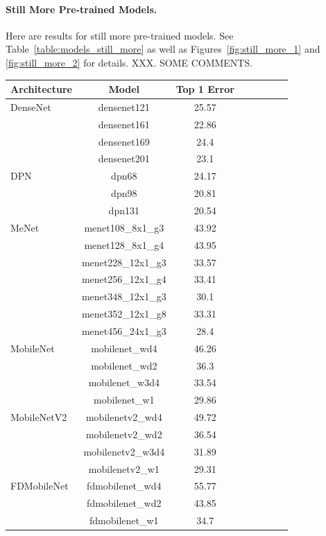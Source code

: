{\paragraph{Still More Pre-trained Models.}

Here are results for still more pre-trained models.
See
Table~\ref{table:models_still_more}
as well as
Figures~\ref{fig:still_more_1} and \ref{fig:still_more_2}
for details.
XXX.  SOME COMMENTS.


\begin{table}[!htb]
\small
\begin{center}
\begin{tabular}{|p{1in}|c|c|c|c|c|c|c|}
\hline
Architecture 
 & Model
 & Top 1 Error \\
 \hline
 DenseNet & densenet121 & 25.57 & \\
& densenet161 & 22.86 & \\
& densenet169 & 24.4 & \\
& densenet201 & 23.1 & \\\hline
DPN & dpn68 & 24.17 & \\
& dpn98 & 20.81 & \\
& dpn131 & 20.54 & \\
\hline
MeNet & menet108\_8x1\_g3 & 43.92 & \\
& menet128\_8x1\_g4 & 43.95 & \\
& menet228\_12x1\_g3 & 33.57 & \\
& menet256\_12x1\_g4 & 33.41 & \\
& menet348\_12x1\_g3 & 30.1 & \\
& menet352\_12x1\_g8 & 33.31 & \\
& menet456\_24x1\_g3 & 28.4 & \\
\hline
MobileNet & mobilenet\_wd4 & 46.26 & \\
& mobilenet\_wd2 & 36.3 & \\
& mobilenet\_w3d4 & 33.54 & \\
& mobilenet\_w1 & 29.86 & \\
\hline
MobileNetV2 & mobilenetv2\_wd4 & 49.72 & \\
& mobilenetv2\_wd2 & 36.54 & \\
& mobilenetv2\_w3d4 & 31.89 & \\
& mobilenetv2\_w1 & 29.31 & \\
\hline
FDMobileNet & fdmobilenet\_wd4 & 55.77 & \\
& fdmobilenet\_wd2 & 43.85 & \\
& fdmobilenet\_w1 & 34.7 & \\

\end{tabular}
\end{center}
\end{table}}
